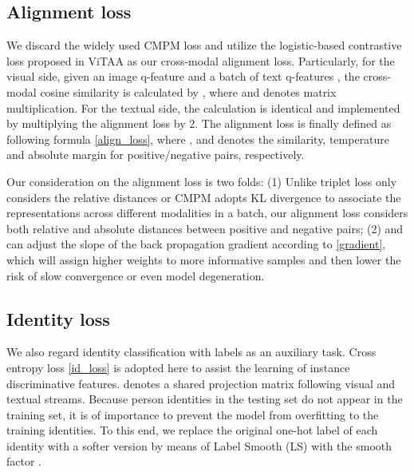 \documentclass{bmvc2k}
\begin{document}
\vspace*{-4mm}
\subsection{Alignment loss} We discard the widely used CMPM loss \cite{zhang2018cmpc} and utilize the logistic-based contrastive loss proposed in ViTAA \cite{wang2020vitaa} as our cross-modal alignment loss. Particularly, for the visual side, given an image q-feature  and a batch of text q-features , the cross-modal cosine similarity  is calculated by , where  and  denotes matrix multiplication. For the textual side, the calculation is identical and implemented by multiplying the alignment loss by 2. The alignment loss is finally defined as following formula \ref{align_loss}, where ,  and  denotes the similarity, temperature and absolute margin for positive/negative pairs, respectively.


Our consideration on the alignment loss is two folds: (1) Unlike triplet loss only considers the relative distances or CMPM \cite{zhang2018cmpc} adopts KL divergence to associate the representations across different modalities in a batch, our alignment loss considers both relative and absolute distances between positive and negative pairs; (2)  and  can adjust the slope of the back propagation gradient according to \ref{gradient}, which will assign higher weights to more informative samples and then lower the risk of slow convergence or even model degeneration. 


\subsection{Identity loss} We also regard identity classification with  labels as an auxiliary task. Cross entropy loss \ref{id_loss} is adopted here to assist the learning of instance discriminative features.  denotes a shared projection matrix following visual and textual streams. Because
person identities in the testing set do not appear in the training set, it is of importance to prevent the model from overfitting to the training identities. To this end, we replace the original one-hot label of each identity with a softer version by means of Label Smooth (LS) \cite{szegedy2016ls, luo2019strong}  with the smooth factor .
\end{document}

